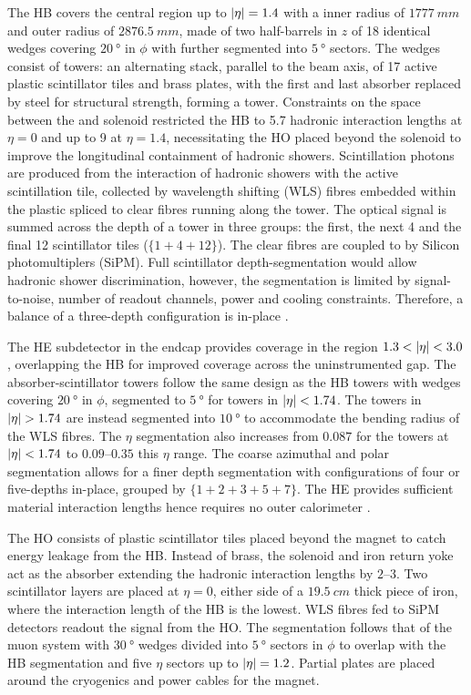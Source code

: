 The HB covers the central region up to $|\eta|=1.4$ with a inner radius of
${\SI{1777}{mm}}$ and outer radius of ${\SI{2876.5}{mm}}$, made of two
half-barrels in $z$ of 18 identical wedges covering ${\SI{20}{\degree}}$ in
$\phi$ with further segmented into  ${\SI{5}{\degree}}$ sectors. The wedges
consist of towers: an alternating stack, parallel to the beam axis, of 17
active plastic scintillator tiles and brass plates, with the first and last
absorber replaced by steel for structural strength, forming a tower.
Constraints on the space  between the \ECAL and solenoid restricted the HB to
5.7 hadronic interaction lengths at ${\eta=0}$ and up to 9 at ${\eta=1.4}$,
necessitating the HO placed beyond the solenoid to improve the longitudinal
containment of hadronic showers. Scintillation photons are produced from the
interaction of hadronic showers with the active scintillation tile, collected
by wavelength shifting (WLS) fibres embedded within the plastic spliced to
clear fibres running along the tower. The optical signal is summed across the
depth of a tower in three groups: the first, the next 4 and the final 12
scintillator tiles (${\{1+4+12\}}$). The clear fibres are coupled to by
Silicon photomultiplers (SiPM). Full scintillator depth-segmentation would
allow hadronic shower discrimination, however, the segmentation is limited by
signal-to-noise, number of readout channels, power and cooling constraints.
Therefore, a balance of a three-depth configuration is in-place
\cite{Mans:1481837}.

The HE subdetector in the endcap provides coverage in the region
${1.3<\aeta<3.0}$, overlapping the HB for improved coverage across the
uninstrumented gap. The absorber-scintillator towers follow the same design as
the HB towers with wedges covering ${\SI{20}{\degree}}$ in $\phi$, segmented
to ${\SI{5}{\degree}}$ for towers in ${|\eta|<1.74}$. The towers in
${\aeta>1.74}$ are instead segmented into ${\SI{10}{\degree}}$ to accommodate
the bending radius of the WLS fibres. The $\eta$ segmentation also increases
from ${0.087}$ for the towers at ${|\eta|<1.74}$ to $0.09$--$0.35$ this $\eta$
range. The coarse azimuthal and polar segmentation allows for a finer depth
segmentation with configurations of four or five-depths in-place, grouped by
${\{1+2+3+5+7\}}$. The HE provides sufficient material interaction lengths
hence requires no outer calorimeter \cite{Mans:1481837}.

The HO consists of plastic scintillator tiles placed beyond the magnet to
catch energy leakage from the HB. Instead of brass, the solenoid and iron
return yoke act as the absorber extending the hadronic interaction lengths by
$2$--$3$. Two scintillator layers are placed at ${\eta=0}$, either side of a
${\SI{19.5}{cm}}$ thick piece of iron, where the interaction length of the HB
is the lowest. WLS fibres fed to SiPM detectors readout the signal from the
HO. The segmentation follows that of the muon system with ${\SI{30}{\degree}}$
wedges divided into ${\SI{5}{\degree}}$ sectors in $\phi$ to overlap with the
HB segmentation and five $\eta$ sectors up to ${|\eta|=1.2}$. Partial plates
are placed around the cryogenics and power cables for the magnet.

